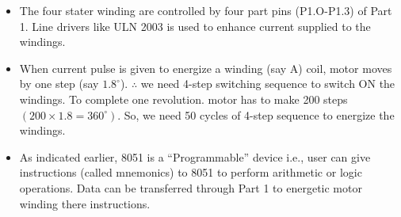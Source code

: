 \begin{itemize}
\item The four stater winding are controlled by four part pins (P1.O-P1.3) of Part 1. Line drivers like ULN 2003 is used to enhance current supplied to the windings.

\item When current pulse is given to energize a winding (say A) coil, motor moves by one step (say $1.8^{\circ}$). $\therefore$ we need 4-step switching sequence to switch ON the windings. To complete one revolution. motor has to make 200 steps $(200\times 1.8=360^{\circ})$. So, we need 50 cycles of 4-step sequence to energize the windings.

\item As indicated earlier, 8051 is a ``Programmable'' device i.e., user can give instructions (called mnemonics) to 8051 to perform arithmetic or logic operations. Data can be transferred through Part 1 to energetic motor winding there instructions. 
\end{itemize}


\label{7end}
